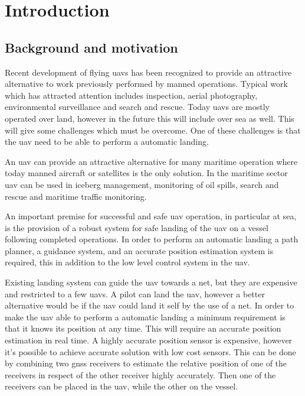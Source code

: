 
\chapter{Introduction}

\section{Background and motivation}
Recent development of flying \glspl{uav} has been recognized to provide an attractive alternative to work previously performed by manned operations. Typical work which has attracted attention includes inspection, aerial photography, environmental surveillance and search and rescue. Today \glspl{uav} are mostly operated over land, however in the future this will include over sea as well. This will give some challenges which must be overcome. One of these challenges is that the \gls{uav} need to be able to perform a automatic landing.

An \gls{uav} can provide an attractive alternative for many maritime operation where today manned aircraft or satellites is the only solution. In the maritime sector \gls{uav} can be used in iceberg management, monitoring of oil spills, search and rescue and maritime traffic monitoring.

An important premise for successful and safe \gls{uav} operation, in particular at sea, is the provision of a robust system for safe landing of the \gls{uav} on a vessel following completed operations. In order to perform an automatic landing a path planner, a guidance system, and an accurate position estimation system is required, this in addition to the low level control system in the \gls{uav}.

Existing landing system can guide the \gls{uav} towards a net, but they are expensive and restricted to a few \glspl{uav}. A pilot can land the \gls{uav}, however a better alternative would be if the \gls{uav} could land it self by the use of a net. In order to make the \gls{uav} able to perform a automatic landing a minimum requirement is that it knows its position at any time. This will require an accurate position estimation in real time. A highly accurate position sensor is expensive, however it's possible to achieve accurate solution with low cost sensors. This can be done by combining two \gls{gnss} receivers to estimate the relative position of one of the receivers in respect of the other receiver highly accurately. Then one of the receivers can be placed in the \gls{uav}, while the other on the vessel.

